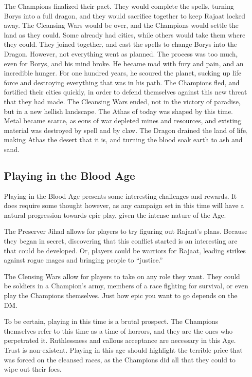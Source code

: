The Champions finalized their pact. They would complete the spells, turning Borys into a full dragon, and they would sacrifice together to keep Rajaat locked away. The Cleansing Wars would be over, and the Champions would settle the land as they could. Some already had cities, while others would take them where they could. They joined together, and cast the spells to change Borys into the Dragon. However, not everything went as planned. The process was too much, even for Borys, and his mind broke. He became mad with fury and pain, and an incredible hunger. For one hundred years, he scoured the planet, sucking up life force and destroying everything that was in his path. The Champions fled, and fortified their cities quickly, in order to defend themselves against this new threat that they had made. The Cleansing Wars ended, not in the victory of paradise, but in a new hellish landscape. The Athas of today was shaped by this time. Metal became scarce, as eons of war depleted mines and resources, and existing material was destroyed by spell and by claw. The Dragon drained the land of life, making Athas the desert that it is, and turning the blood soak earth to ash and sand.

\subsection{Playing in the Blood Age}
Playing in the Blood Age presents some interesting challenges and rewards. It does require some thought however, as any campaign set in this time will have a natural progression towards epic play, given the intense nature of the Age.

The Preserver Jihad allows for players to try figuring out Rajaat's plans. Because they began in secret, discovering that this conflict started is an interesting arc that could be developed. Or, players could be warriors for Rajaat, leading strikes against rogue mages and bringing people to ``justice.''

The Clensing Wars allow for players to take on any role they want. They could be soldiers in a Champion's army, members of a race fighting for survival, or even play the Champions themselves. Just how epic you want to go depends on the DM.

To be certain, playing in this time is a brutal prospect. The Champions themselves refer to this time as a time of horrors, and they are the ones who perpetrated it. Ruthlessness and callous acceptance are necessary in this Age. Trust is non-existent. Playing in this age should highlight the terrible price that was forced on the cleansed races, as the Champions did all that they could to wipe out their foes.

